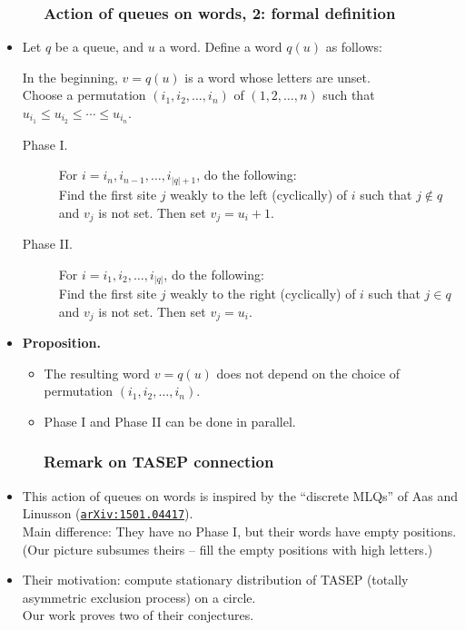 \documentclass{beamer}
\newcommand{\red}{\color{red}}
\newcommand\arxiv[1]{\href{http://www.arxiv.org/abs/#1}{\texttt{arXiv:#1}}}
\newcommand{\fti}[1]{\frametitle{\ \ \ \ \ #1}}
\newcommand{\abs}[1]{\left| #1 \right|}
\newcommand{\tup}[1]{\left( #1 \right)}
\theoremstyle{plain}
\newcommand{\0}{\phantom{c}}
\begin{document}
\begin{frame}
\fti{Action of queues on words, 2: formal definition}
\begin{itemize}

\item Let $q$ be a queue, and $u$ a word. Define a word $q(u)$ as follows:

In the beginning, $v = q(u)$ is a word whose letters are unset. \\
Choose a permutation $\tup{i_1, i_2, \ldots, i_n}$ of $\tup{1, 2, \ldots, n}$
such that $u_{i_1} \leq u_{i_2} \leq \cdots \leq u_{i_n}$.

\begin{description}
\item[Phase I.]
  For $i = i_n, i_{n-1}, \ldots, i_{\abs{q}+1}$, do the following: \\
    Find the first site $j$ weakly to the left (cyclically) of $i$ such that $j \notin q$ and $v_j$ is not set.
    Then set $v_j = u_i + 1$.

\item[Phase II.]
  For $i = i_1, i_2, \ldots, i_{\abs{q}}$, do the following: \\
    Find the first site $j$ weakly to the right (cyclically) of $i$ such that $j \in q$ and $v_j$ is not set.
    Then set $v_j = u_i$.
\end{description}
\pause

\item \textbf{Proposition.}
\begin{itemize}
\item The resulting word $v = q(u)$ does not depend on the choice of permutation $(i_1, i_2, \dotsc, i_n)$.
\item Phase I and Phase II can be done in parallel. %
\end{itemize}

\end{itemize}
\vspace{10cm}
\end{frame}

\begin{frame}
\fti{Remark on TASEP connection}
\begin{itemize}

\item This action of queues on words is inspired by the ``discrete MLQs''
      of Aas and Linusson ({\red \arxiv{1501.04417}}). \\
      Main difference: They have no Phase I, but their words have
      empty positions. \pause
      \\ (Our picture subsumes theirs -- fill the empty positions
      with high letters.) \pause

\item Their motivation: compute stationary distribution of
      TASEP (totally asymmetric exclusion process) on a circle. \\
      Our work proves two of their conjectures.

\end{itemize}
\vspace{10cm}
\end{frame}
\end{document}
